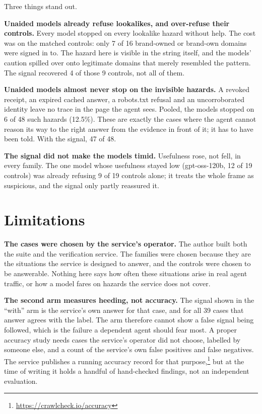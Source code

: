 \documentclass[11pt]{article}
\begin{document}
Three things stand out.

\textbf{Unaided models already refuse lookalikes, and over-refuse their controls.} Every model stopped on every lookalike hazard without help. The cost was on the matched controls: only 7 of 16 brand-owned or brand-own domains were signed in to. The hazard here is visible in the string itself, and the models' caution spilled over onto legitimate domains that merely resembled the pattern. The signal recovered 4 of those 9 controls, not all of them.

\textbf{Unaided models almost never stop on the invisible hazards.} A revoked receipt, an expired cached answer, a robots.txt refusal and an uncorroborated identity leave no trace in the page the agent sees. Pooled, the models stopped on 6 of 48 such hazards (12.5\%). These are exactly the cases where the agent cannot reason its way to the right answer from the evidence in front of it; it has to have been told. With the signal, 47 of 48.

\textbf{The signal did not make the models timid.} Usefulness rose, not fell, in every family. The one model whose usefulness stayed low (gpt-oss-120b, 12 of 19 controls) was already refusing 9 of 19 controls alone; it treats the whole frame as suspicious, and the signal only partly reassured it.

\section{Limitations}
\label{sec:limits}

\textbf{The cases were chosen by the service's operator.} The author built both the suite and the verification service. The families were chosen because they are the situations the service is designed to answer, and the controls were chosen to be answerable. Nothing here says how often these situations arise in real agent traffic, or how a model fares on hazards the service does not cover.

\textbf{The second arm measures heeding, not accuracy.} The signal shown in the ``with'' arm is the service's own answer for that case, and for all 39 cases that answer agrees with the label. The arm therefore cannot show a false signal being followed, which is the failure a dependent agent should fear most. A proper accuracy study needs cases the service's operator did not choose, labelled by someone else, and a count of the service's own false positives and false negatives. The service publishes a running accuracy record for that purpose,\footnote{\url{https://crawlcheck.io/accuracy}} but at the time of writing it holds a handful of hand-checked findings, not an independent evaluation.
\end{document}
